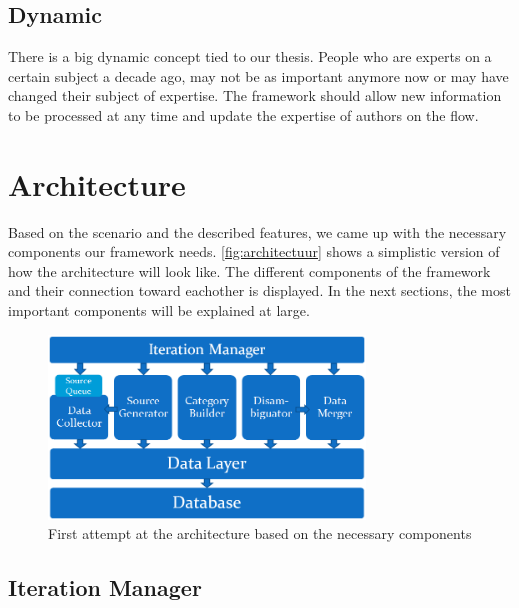 \subsection{Dynamic}

There is a big dynamic concept tied to our thesis. People who are experts on a certain subject a decade ago, may not be as important anymore now or may have changed their subject of expertise. The framework should allow new information to be processed at any time and update the expertise of authors on the flow.

\section{Architecture}


Based on the scenario and the described features, we came up with the necessary components our framework needs. \autoref{fig:architectuur} shows a simplistic version of how the architecture will look like. The different components of the framework and their connection toward eachother is displayed. In the next sections, the most important components will be explained at large.


\begin{figure}[htbp]
	\centering
		\includegraphics[width=0.75\textwidth]{fig/architectuur.png}
	\caption{First attempt at the architecture based on the necessary components}
	\label{fig:architectuur}
\end{figure}

\subsection{Iteration Manager}

